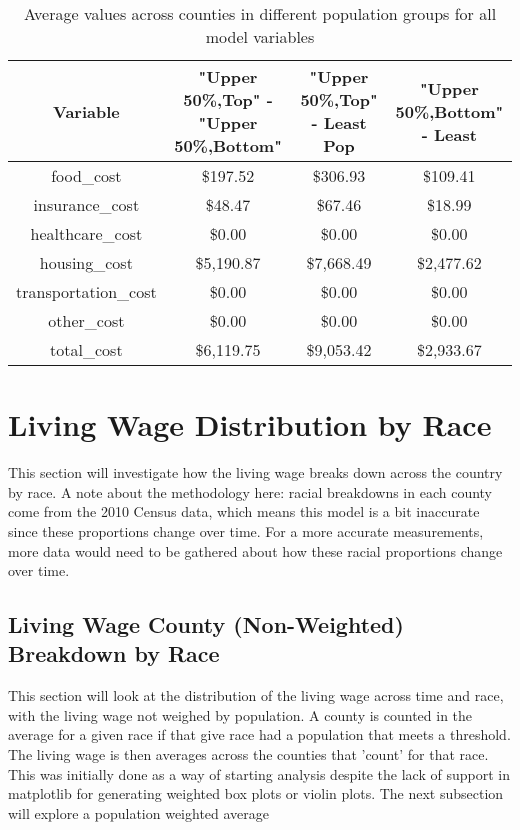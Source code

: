 \begin{table}[H]
\footnotesize
\centering
 \begin{tabular}{||c c c c||} 
 \hline
 Variable & "Upper 50\%,Top" - "Upper 50\%,Bottom" & "Upper 50\%,Top" - Least Pop & "Upper 50\%,Bottom" - Least\\ [0.1ex] 
 \hline\hline
 food\_cost & \$197.52 & \$306.93 & \$109.41 \\ 
 insurance\_cost & \$48.47 & \$67.46 & \$18.99 \\
 healthcare\_cost & \$0.00 &	\$0.00 & \$0.00 \\
 housing\_cost &	\$5,190.87 &	\$7,668.49 &	 \$2,477.62 \\
 transportation\_cost & \$0.00 & \$0.00 & \$0.00 \\
 other\_cost & \$0.00 & \$0.00 & \$0.00 \\
 total\_cost & \$6,119.75 & \$9,053.42 & \$2,933.67 \\ [1ex] 
 \hline
 \end{tabular}
 \caption{Average values across counties in different population groups for all model variables}
 \label{tab:ch4_table_variable_delta_by_population}
\end{table}




\section{Living Wage Distribution by Race}

This section will investigate how the living wage breaks down across the country by race. A note about the methodology here: racial breakdowns in each county come from the 2010 Census data, which means this model is a bit inaccurate since these proportions change over time. For a more accurate measurements, more data would need to be gathered about how these racial proportions change over time.

\subsection{Living Wage County (Non-Weighted) Breakdown by Race}

This section will look at the distribution of the living wage across time and race, with the living wage not weighed by population. A county is counted in the average for a given race if that give race had a population that meets a threshold. The living wage is then averages across the counties that 'count' for that race. This was initially done as a way of starting analysis despite the lack of support in matplotlib for generating weighted box plots or violin plots. The next subsection will explore a population weighted average

